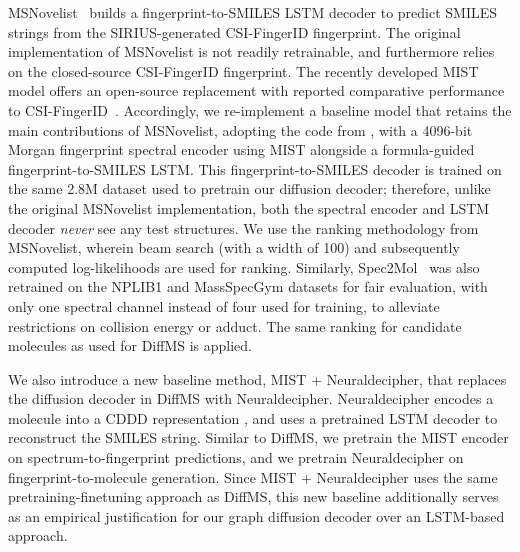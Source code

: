 \documentclass{article}
\theoremstyle{plain}
\theoremstyle{definition}
\theoremstyle{remark}
\newcommand{\ours}{DiffMS\xspace}
\begin{document}
MSNovelist~\citep{stravs2022msnovelist} builds a fingerprint-to-SMILES LSTM decoder to predict SMILES strings from the SIRIUS-generated CSI-FingerID fingerprint. The original implementation of MSNovelist is not readily retrainable, and furthermore relies on the closed-source CSI-FingerID fingerprint. The recently developed MIST model offers an open-source replacement with reported comparative performance to CSI-FingerID~\citep{goldman2023mist}. %
Accordingly, we re-implement a baseline model that retains the main contributions of MSNovelist, adopting the code from \citet{Zhao2024-ew}, with a 4096-bit Morgan fingerprint spectral encoder using MIST alongside a formula-guided fingerprint-to-SMILES LSTM. %
This fingerprint-to-SMILES decoder is trained on the same 2.8M dataset used to pretrain our diffusion decoder; therefore, unlike the original MSNovelist implementation, both the spectral encoder and LSTM decoder \emph{never} see %
any test structures. We use the ranking methodology from MSNovelist, wherein beam search (with a width of 100) and subsequently computed log-likelihoods are used for ranking. 
Similarly, Spec2Mol~\citep{litsa2023spec2mol} %
was also retrained on the NPLIB1 and MassSpecGym datasets for fair evaluation, with only one spectral channel instead of four used for training, to alleviate restrictions on collision energy or adduct. The same ranking for candidate molecules as used for \ours is applied.


We also introduce a new baseline method, MIST + Neuraldecipher, that replaces the diffusion decoder in \ours with Neuraldecipher. Neuraldecipher encodes a molecule into a CDDD representation \citep{C8SC04175J}, and uses a pretrained LSTM decoder to reconstruct the SMILES string. Similar to \ours, we pretrain the MIST encoder on spectrum-to-fingerprint predictions, and we pretrain Neuraldecipher on fingerprint-to-molecule generation. Since MIST + Neuraldecipher uses the same pretraining-finetuning approach as \ours, this new baseline additionally serves as an empirical justification for our graph diffusion decoder over an LSTM-based approach.
\end{document}
